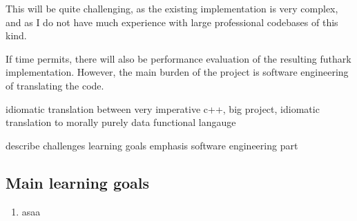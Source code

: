 This will be quite challenging, as the existing implementation is very complex, and as I do not have much experience with large professional codebases of this kind.

If time permits, there will also be performance evaluation of the resulting futhark implementation. However, the main burden of the project is software engineering of translating the code.

idiomatic translation between very imperative c++, big project, idiomatic translation to morally purely data functional langauge

describe challenges
learning goals
emphasis software engineering part
\subsection*{Main learning goals}
\begin{enumerate}
\item asaa
\end{enumerate}

\printbibliography


